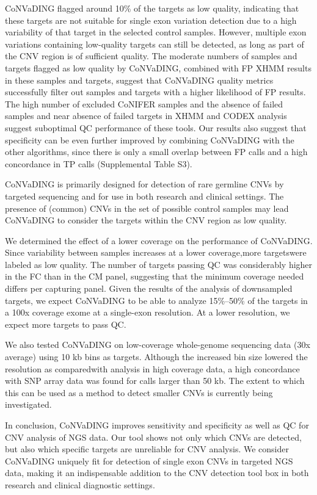 CoNVaDING flagged around 10\% of the targets as low quality, indicating that these targets are not suitable for single exon variation detection due to a high variability of that target in the selected control samples. 
However, multiple exon variations containing low-quality targets can still be detected, as long as part of the CNV region is of sufficient quality. 
The moderate numbers of samples and targets flagged as low quality by CoNVaDING, combined with FP XHMM results in these samples and targets, suggest that CoNVaDING quality metrics successfully filter out samples and targets with a higher likelihood of FP results. 
The high number of excluded CoNIFER samples and the absence of failed samples and near absence of failed targets in XHMM and CODEX analysis suggest suboptimal QC performance of these tools. 
Our results also suggest that specificity can be even further improved by combining CoNVaDING with the other algorithms, since there is only a small overlap between FP calls and a high concordance in TP calls (Supplemental Table S3). 

CoNVaDING is primarily designed for detection of rare germline CNVs by targeted sequencing and for use in both research and clinical settings. 
The presence of (common) CNVs in the set of possible control samples may lead CoNVaDING to consider the targets within the CNV region as low quality. 

We determined the effect of a lower coverage on the performance of CoNVaDING. 
Since variability between samples increases at a lower coverage,more targetswere labeled as low quality. 
The number of targets passing QC was considerably higher in the FC than in the CM panel, suggesting that the minimum coverage needed differs per capturing panel. 
Given the results of the analysis of downsampled targets, we expect CoNVaDING to be able to analyze 15\%–50\% of the targets in a 100x coverage exome at a single-exon resolution. 
At a lower resolution, we expect more targets to pass QC. 

We also tested CoNVaDING on low-coverage whole-genome sequencing data (30x average) using 10 kb bins as targets. 
Although the increased bin size lowered the resolution as comparedwith analysis in high coverage data, a high concordance with SNP array data was found for calls larger than 50 kb. 
The extent to which this can be used as a method to detect smaller CNVs is currently being investigated. 

In conclusion, CoNVaDING improves sensitivity and specificity as well as QC for CNV analysis of NGS data. 
Our tool shows not only which CNVs are detected, but also which specific targets are unreliable for CNV analysis. 
We consider CoNVaDING uniquely fit for detection of single exon CNVs in targeted NGS data, making it an indispensable addition to the CNV detection tool box in both research and clinical diagnostic settings.


